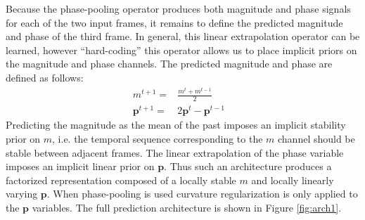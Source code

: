 \documentclass{article} %
\begin{document}
Because the phase-pooling operator produces both magnitude and phase signals for each of the two input frames, it remains to define the predicted magnitude and phase of the third frame. In general, this linear extrapolation operator can be learned, however ``hard-coding'' this operator allows us to place implicit priors on the magnitude and phase channels. The predicted magnitude and phase are defined as follows: 
\begin{eqnarray}
m^{t+1}=&\frac{m^t + m^{t-1}}{2}&\\
\label{eqn:magpred} 
\mathbf p^{t+1}=&2\mathbf p^t-\mathbf p^{t-1}& 
\label{eqn:phasepred} 
\end{eqnarray} 
Predicting the magnitude as the mean of the past imposes an implicit stability prior on $m$, i.e. the temporal sequence corresponding to the $m$ channel should be stable between adjacent frames. The linear extrapolation of the phase variable imposes an implicit linear prior on $\mathbf p$. Thus such an architecture produces a factorized representation composed of a locally stable $m$ and locally linearly varying $\mathbf p$. When phase-pooling is used curvature regularization is only applied to the $\mathbf p$ variables. The full prediction architecture is shown in Figure \ref{fig:arch1}.  

\end{document}
